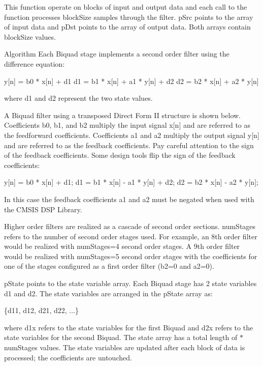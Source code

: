 This function operate on blocks of input and output data and each call to the function processes {\ttfamily block\-Size} samples through the filter. {\ttfamily p\-Src} points to the array of input data and {\ttfamily p\-Dst} points to the array of output data. Both arrays contain {\ttfamily block\-Size} values.

\begin{DoxyParagraph}{Algorithm }
Each Biquad stage implements a second order filter using the difference equation\-: 
\begin{DoxyPre}   
   y[n] = b0 * x[n] + d1   
   d1 = b1 * x[n] + a1 * y[n] + d2   
   d2 = b2 * x[n] + a2 * y[n]   
\end{DoxyPre}
 where d1 and d2 represent the two state values.
\end{DoxyParagraph}
\begin{DoxyParagraph}{}
A Biquad filter using a transposed Direct Form I\-I structure is shown below.  Coefficients {\ttfamily b0, b1, and b2 } multiply the input signal {\ttfamily x\mbox{[}n\mbox{]}} and are referred to as the feedforward coefficients. Coefficients {\ttfamily a1} and {\ttfamily a2} multiply the output signal {\ttfamily y\mbox{[}n\mbox{]}} and are referred to as the feedback coefficients. Pay careful attention to the sign of the feedback coefficients. Some design tools flip the sign of the feedback coefficients\-: 
\begin{DoxyPre}   
   y[n] = b0 * x[n] + d1;   
   d1 = b1 * x[n] - a1 * y[n] + d2;   
   d2 = b2 * x[n] - a2 * y[n];   
\end{DoxyPre}
 In this case the feedback coefficients {\ttfamily a1} and {\ttfamily a2} must be negated when used with the C\-M\-S\-I\-S D\-S\-P Library.
\end{DoxyParagraph}
\begin{DoxyParagraph}{}
Higher order filters are realized as a cascade of second order sections. {\ttfamily num\-Stages} refers to the number of second order stages used. For example, an 8th order filter would be realized with {\ttfamily num\-Stages=4} second order stages. A 9th order filter would be realized with {\ttfamily num\-Stages=5} second order stages with the coefficients for one of the stages configured as a first order filter ({\ttfamily b2=0} and {\ttfamily a2=0}).
\end{DoxyParagraph}
\begin{DoxyParagraph}{}
{\ttfamily p\-State} points to the state variable array. Each Biquad stage has 2 state variables {\ttfamily d1} and {\ttfamily d2}. The state variables are arranged in the {\ttfamily p\-State} array as\-: 
\begin{DoxyPre}   
    \{d11, d12, d21, d22, ...\}   
\end{DoxyPre}
 where {\ttfamily d1x} refers to the state variables for the first Biquad and {\ttfamily d2x} refers to the state variables for the second Biquad. The state array has a total length of {$\ast$num\-Stages} values. The state variables are updated after each block of data is processed; the coefficients are untouched.
\end{DoxyParagraph}
